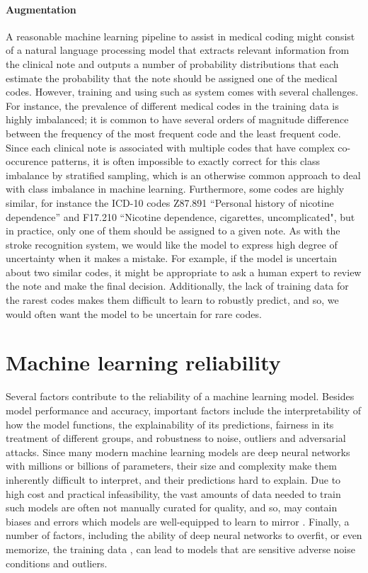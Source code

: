 \paragraph{Augmentation} A reasonable machine learning pipeline to assist in medical coding might consist of a natural language processing model that extracts relevant information from the clinical note and outputs a number of probability distributions that each estimate the probability that the note should be assigned one of the medical codes. 
However, training and using such as system comes with several challenges. 
For instance, the prevalence of different medical codes in the training data is highly imbalanced; it is common to have several orders of magnitude difference between the frequency of the most frequent code and the least frequent code. Since each clinical note is associated with multiple codes that have complex co-occurence patterns, it is often impossible to exactly correct for this class imbalance by stratified sampling, which is an otherwise common approach to deal with class imbalance in machine learning. 
Furthermore, some codes are highly similar, for instance the ICD-10 codes Z87.891 ``Personal history of nicotine dependence'' and F17.210 ``Nicotine dependence, cigarettes, uncomplicated", but in practice, only one of them should be assigned to a given note. 
As with the stroke recognition system, we would like the model to express high degree of uncertainty when it makes a mistake. For example, if the model is uncertain about two similar codes, it might be appropriate to ask a human expert to review the note and make the final decision. Additionally, the lack of training data for the rarest codes makes them difficult to learn to robustly predict, and so, we would often want the model to be uncertain for rare codes. 


\section{Machine learning reliability} \label{sec:machine-learning-reliability}
%
Several factors contribute to the reliability of a machine learning model. 
Besides model performance and accuracy, important factors include the interpretability of how the model functions, the explainability of its predictions, fairness in its treatment of different groups, and robustness to noise, outliers and adversarial attacks. 
Since many modern machine learning models are deep neural networks with millions or billions of parameters, their size and complexity make them inherently difficult to interpret, and their predictions hard to explain. Due to high cost and practical infeasibility, the vast amounts of data needed to train such models are often not manually curated for quality, and so, may contain biases and errors which models are well-equipped to learn to mirror \parencite{burkart_survey_2021}. 
Finally, a number of factors, including the ability of deep neural networks to overfit, or even memorize, the training data \parencite{arpit_closer_2017, burg_memorization_2021}, can lead to models that are sensitive adverse noise conditions and outliers. 

